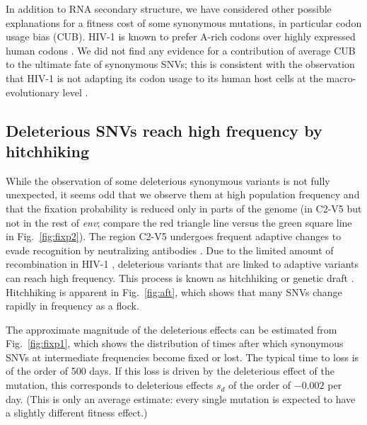 \documentclass[11pt]{article}
\newcommand{\FIG}[1]{Fig.~\ref{fig:#1}}
\newcommand{\env}{\textit{env}}
\newcommand{\shankaregion}{C2-V5}
\begin{document}
In addition to RNA secondary structure, we have considered other possible
explanations for a fitness cost of some synonymous mutations, in particular
codon usage bias (CUB). HIV-1 is known to prefer A-rich codons over highly
expressed human codons \citep{jenkins_extent_2003, kuyl_biased_2012}. We
did not find any evidence for a contribution of average CUB to the ultimate
fate of synonymous SNVs; this is consistent with the observation that HIV-1 is not
adapting its codon usage to its human host cells at the macro-evolutionary level
\citep{kuyl_biased_2012}.


\subsection*{Deleterious SNVs reach high frequency by hitchhiking}
While the observation of some deleterious synonymous variants is not fully
unexpected, it seems odd that we observe them at high population
frequency and that the fixation probability is reduced only in parts of the
genome (in \shankaregion{} but not in the rest of \env{}; compare the red
triangle line versus the green square line in \FIG{fixp2}).
The region \shankaregion{} undergoes frequent adaptive changes to evade
recognition by neutralizing antibodies \cite{williamson_adaptation_2003,
richman_rapid_2003}. Due to the limited amount of recombination in HIV-1
\cite{neher_recombination_2010, batorsky_estimate_2011}, deleterious variants
that are linked to adaptive variants can reach high frequency. This process is
known as hitchhiking \citep{smith_hitch-hiking_1974} or genetic draft
\citep{gillespie_genetic_2000,neher_genetic_2011}. Hitchhiking is apparent in
\FIG{aft}, which shows that many SNVs change rapidly in frequency as a
flock. 

The approximate magnitude of the deleterious effects can be estimated from
\FIG{fixp1}, which shows the distribution of times after which synonymous
SNVs at intermediate frequencies become fixed or lost. The typical time to
loss is of the order of 500 days. If this loss is driven by the deleterious
effect of the mutation, this corresponds to deleterious effects $s_d$ of the
order of $-0.002$ per day. (This is only an average estimate: every single
mutation is expected to have a slightly different fitness effect.)
\end{document}
